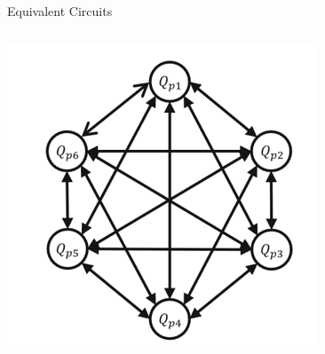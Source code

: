 \documentclass{beamer}
\begin{document}
\begin{frame}{Equivalent Circuits}
\begin{columns}
        \pause
        \centering
        \includegraphics[width=\columnwidth]{images/algoqubits.png}
    \end{columns}
\end{frame}
\end{document}
